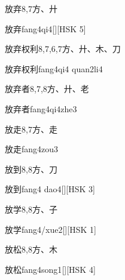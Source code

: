 \begin{Entry}{放弃}{8,7}{⽅、⼶}
  \begin{Phonetics}{放弃}{fang4qi4}[][HSK 5]
  \end{Phonetics}
\end{Entry}

\begin{Entry}{放弃权利}{8,7,6,7}{⽅、⼶、⽊、⼑}
  \begin{Phonetics}{放弃权利}{fang4qi4 quan2li4}
  \end{Phonetics}
\end{Entry}

\begin{Entry}{放弃者}{8,7,8}{⽅、⼶、⽼}
  \begin{Phonetics}{放弃者}{fang4qi4zhe3}
  \end{Phonetics}
\end{Entry}

\begin{Entry}{放走}{8,7}{⽅、⾛}
  \begin{Phonetics}{放走}{fang4zou3}
  \end{Phonetics}
\end{Entry}

\begin{Entry}{放到}{8,8}{⽅、⼑}
  \begin{Phonetics}{放到}{fang4 dao4}[][HSK 3]
  \end{Phonetics}
\end{Entry}

\begin{Entry}{放学}{8,8}{⽅、⼦}
  \begin{Phonetics}{放学}{fang4/xue2}[][HSK 1]
  \end{Phonetics}
\end{Entry}

\begin{Entry}{放松}{8,8}{⽅、⽊}
  \begin{Phonetics}{放松}{fang4song1}[][HSK 4]
  \end{Phonetics}
\end{Entry}

